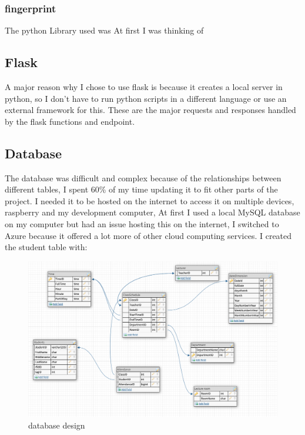\subsubsection{fingerprint}
The python Library used was 
At first I was thinking of 

\subsection{Flask}
A major reason why I chose to use flask is because it creates a local server in python, so I don't have to run python scripts in a different language or use an external framework for this.
These are the major requests and responses handled by the flask functions and endpoint.



\subsection{Database}
The database was difficult and complex because of the relationships between different tables, I spent 60\% of my time updating it to fit other parts of the project. I needed it to be hosted on the internet to access it on multiple devices, raspberry and my development computer, At first I used a local MySQL database on my computer but had an issue hosting this on the internet, I switched to Azure because it offered a lot more of other cloud computing services. I created the student table with:

\begin{figure}[ht]
  \includegraphics[scale=0.4]{Design & Implementation/images/database_design.png}
  \caption{database design}
\end{figure}
